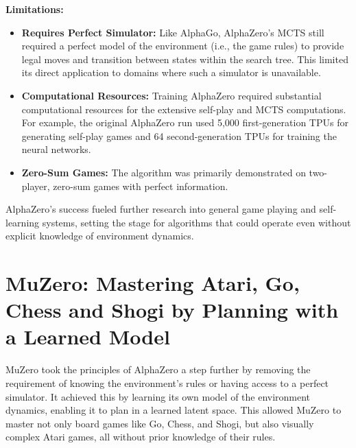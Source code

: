 \documentclass[11pt,a4paper]{article}
\begin{document}
\textbf{Limitations:}
\begin{itemize}
    \item \textbf{Requires Perfect Simulator:} Like AlphaGo, AlphaZero's MCTS still required a perfect model of the environment (i.e., the game rules) to provide legal moves and transition between states within the search tree. This limited its direct application to domains where such a simulator is unavailable.
    \item \textbf{Computational Resources:} Training AlphaZero required substantial computational resources for the extensive self-play and MCTS computations. For example, the original AlphaZero run used 5,000 first-generation TPUs for generating self-play games and 64 second-generation TPUs for training the neural networks.
    \item \textbf{Zero-Sum Games:} The algorithm was primarily demonstrated on two-player, zero-sum games with perfect information.
\end{itemize}
AlphaZero's success fueled further research into general game playing and self-learning systems, setting the stage for algorithms that could operate even without explicit knowledge of environment dynamics.

\section{MuZero: Mastering Atari, Go, Chess and Shogi by Planning with a Learned Model}
MuZero \cite{muzero} took the principles of AlphaZero a step further by removing the requirement of knowing the environment's rules or having access to a perfect simulator. It achieved this by learning its own model of the environment dynamics, enabling it to plan in a learned latent space. This allowed MuZero to master not only board games like Go, Chess, and Shogi, but also visually complex Atari games, all without prior knowledge of their rules.
\end{document}
